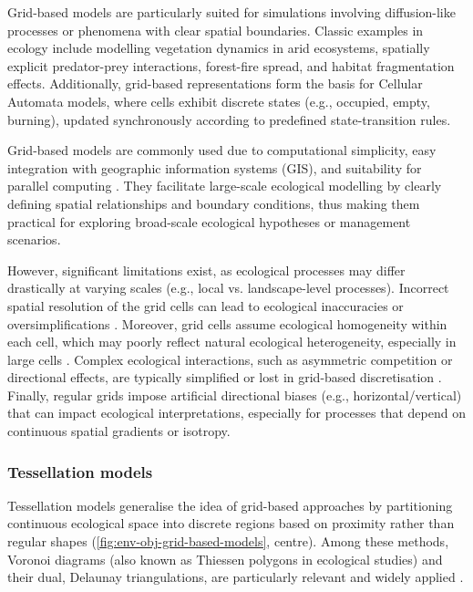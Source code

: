 Grid-based models are particularly suited for simulations involving diffusion-like processes or phenomena with clear spatial boundaries. Classic examples in ecology include modelling vegetation dynamics in arid ecosystems, spatially explicit predator-prey interactions, forest-fire spread, and habitat fragmentation effects. Additionally, grid-based representations form the basis for Cellular Automata models, where cells exhibit discrete states (e.g., occupied, empty, burning), updated synchronously according to predefined state-transition rules.

Grid-based models are commonly used due to computational simplicity, easy integration with geographic information systems (GIS), and suitability for parallel computing \cite{Czaran1998,Nelson2012}. They facilitate large-scale ecological modelling by clearly defining spatial relationships and boundary conditions, thus making them practical for exploring broad-scale ecological hypotheses or management scenarios.

However, significant limitations exist, as ecological processes may differ drastically at varying scales (e.g., local vs. landscape-level processes). Incorrect spatial resolution of the grid cells can lead to ecological inaccuracies or oversimplifications \cite{Wiens1989}. Moreover, grid cells assume ecological homogeneity within each cell, which may poorly reflect natural ecological heterogeneity, especially in large cells \cite{Levin1992}. Complex ecological interactions, such as asymmetric competition or directional effects, are typically simplified or lost in grid-based discretisation \cite{Durrett1994}. Finally, regular grids impose artificial directional biases (e.g., horizontal/vertical) that can impact ecological interpretations, especially for processes that depend on continuous spatial gradients or isotropy.

\subsubsection{Tessellation models}

Tessellation models generalise the idea of grid-based approaches by partitioning continuous ecological space into discrete regions based on proximity rather than regular shapes (\cref{fig:env-obj-grid-based-models}, centre). Among these methods, Voronoi diagrams (also known as Thiessen polygons in ecological studies) and their dual, Delaunay triangulations, are particularly relevant and widely applied \cite{Lemiere2023,Foltete2019,Minor2008}.

